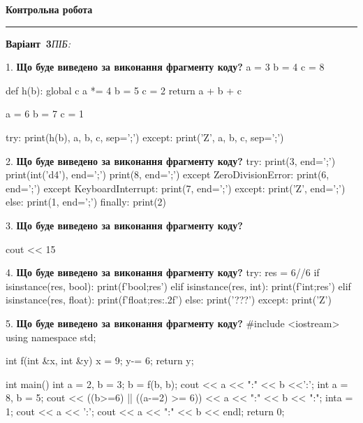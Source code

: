 \documentclass[11pt]{article}
\begin{document}
{\centering\Large\bfseries Контрольна робота\par}
\medskip
\noindent\rule{\linewidth}{0.5pt}
\smallskip
\noindent\textbf{Варіант \No\,3}\hfill \textit{ПІБ:}\,\underline{\hspace{60mm}}
\vspace{4mm}

1. \textbf{Що буде виведено за виконання фрагменту коду?}
a = 3
b = 4
c = 8

def h(b):
global c    a *= 4
    b = 5
    c = 2
    return a + b + c

a = 6
b = 7
c = 1

try:
    print(h(b), a, b, c, sep=';')
except:
    print('Z', a, b, c, sep=';')
\par\vspace{5mm}

2. \textbf{Що буде виведено за виконання фрагменту коду?}
try:
    print(3, end=';')
    print(int('d4'), end=';')
    print(8, end=';')
except ZeroDivisionError:
    print(6, end=';')
except KeyboardInterrupt:
    print(7, end=';')
except:
    print('Z', end=';')
else:
    print(1, end=';')
finally:
    print(2)
\par\vspace{5mm}

3. \textbf{Що буде виведено за виконання фрагменту коду?}

cout << 15 %
\par\vspace{5mm}

4. \textbf{Що буде виведено за виконання фрагменту коду?}
try:
    res = 6//6%
    if isinstance(res, bool):
        print(f'bool;{res}')
    elif isinstance(res, int):
        print(f'int;{res}')
    elif isinstance(res, float):
        print(f'float;{res:.2f}')
    else:
        print('???')
except:
    print('Z')
\par\vspace{5mm}

5. \textbf{Що буде виведено за виконання фрагменту коду?}
#include <iostream>
using namespace std;

int f(int &x, int &y){
    x = 9;
    y-= 6;
    return y;
}

int main(){
    int a = 2, b = 3;
    b = f(b, b);
    cout << a << ":" << b <<':';
    {
        int a = 8, b = 5;
        cout << ((b>=6) || ((a-=2) >= 6))
             << a << ":" << b << ":";
    }
    {
        inta = 1;
        cout << a << ':';
    }
    cout << a << ":" << b << endl;
    return 0;
}
\end{document}
